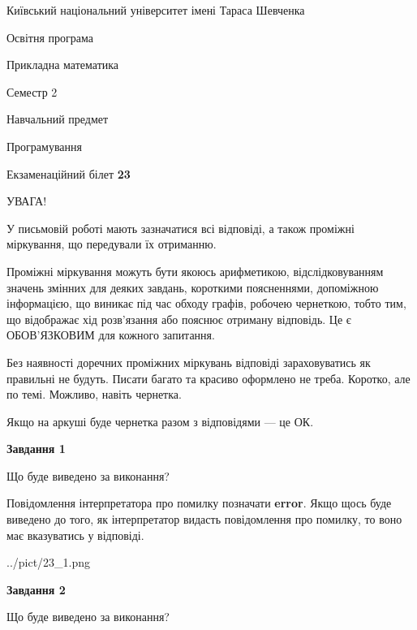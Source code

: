 \documentclass[12pt, ukrainian]{article}
\begin{document}
{{\begin {small}\par
{ \center  Київський національний університет імені Тараса Шевченка \par}
{\parbox {5 cm}{Освітня програма \hfill}{\parbox {7 cm}{Прикладна математика \hfill}}\parbox {6 cm}{\hfill Семестр 2}}\par
{\parbox {5 cm} {Навчальний предмет \hfill}\parbox {7 cm}{Програмування \hfill}\parbox {6cm}{\hfill}\par}\vspace{-7pt} \end{small}}{\center Екзаменаційний білет \No \textbf
{ 23 }\par}}
{
\begin {large}
УВАГА!

У письмовій роботі мають зазначатися всі відповіді, а також проміжні міркування, що передували їх отриманню.

Проміжні міркування можуть бути якоюсь арифметикою, відслідковуванням зна\-чень змінних для деяких завдань,
короткими поясненнями, допоміжною інформацією, що виникає під час обходу графів, робочею чернеткою,
тобто тим, що відображає хід розв’язання або пояснює отриману відповідь.
Це є ОБОВ’ЯЗКОВИМ для кожного запитання.

Без наявності доречних проміжних міркувань відповіді зараховуватись як правиль\-ні не будуть.
Писати багато та красиво оформлено не треба. Коротко, але по темі. Можли\-во, навіть чернетка.

Якщо на аркуші буде чернетка разом з відповідями --- це ОК.

\newpage

{\begin {center}\textbf{Завдання 1}\end {center}}\par
Що буде виведено за виконання?

Повідомлення інтерпретатора про помилку позначати \textbf{error}.
Якщо щось буде виведено до того, як інтерпретатор видасть повідомлення про помилку, 
то воно має вказуватись у відповіді. \par


\begin{center}
	{../pict/23_1.png}
\end{center}
\newpage

{\begin {center}\textbf{Завдання 2}\end {center}}\par
Що буде виведено за виконання?


\end{large}}
\end{document}
